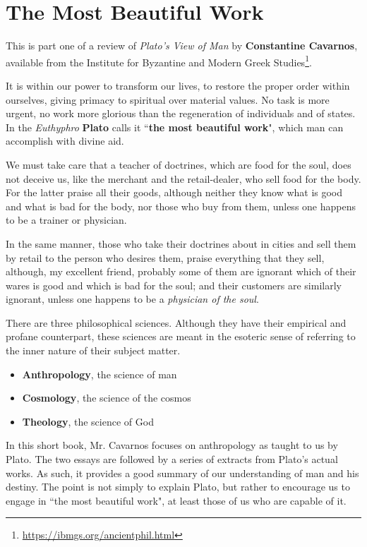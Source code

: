 \section{The Most Beautiful Work}

This is part one of a review of \emph{Plato's View of Man} by \textbf{Constantine Cavarnos}, available from the Institute for Byzantine and Modern Greek Studies\footnote{\url{https://ibmgs.org/ancientphil.html}}.

\begin{quotex}
It is within our power to transform our lives, to restore the proper order within ourselves, giving primacy to spiritual over material values. No task is more urgent, no work more glorious than the regeneration of individuals and of states. In the \emph{Euthyphro} \textbf{Plato} calls it ``\textbf{the most beautiful work}", which man can accomplish with divine aid. 

\end{quotex}
We must take care that a teacher of doctrines, which are food for the soul, does not deceive us, like the merchant and the retail-dealer, who sell food for the body. For the latter praise all their goods, although neither they know what is good and what is bad for the body, nor those who buy from them, unless one happens to be a trainer or physician.

\begin{quotex}
In the same manner, those who take their doctrines about in cities and sell them by retail to the person who desires them, praise everything that they sell, although, my excellent friend, probably some of them are ignorant which of their wares is good and which is bad for the soul; and their customers are similarly ignorant, unless one happens to be a \emph{physician of the soul}. 

\end{quotex}
There are three philosophical sciences. Although they have their empirical and profane counterpart, these sciences are meant in the esoteric sense of referring to the inner nature of their subject matter.

\begin{itemize}
\item \textbf{Anthropology}, the science of man 
\item \textbf{Cosmology}, the science of the cosmos 
\item \textbf{Theology}, the science of God 
\end{itemize}
In this short book, Mr. Cavarnos focuses on anthropology as taught to us by Plato. The two essays are followed by a series of extracts from Plato's actual works. As such, it provides a good summary of our understanding of man and his destiny. The point is not simply to explain Plato, but rather to encourage us to engage in ``the most beautiful work", at least those of us who are capable of it.

